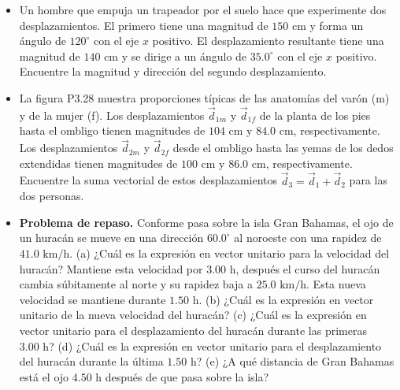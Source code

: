 \documentclass[11pt,a4paper]{article}
\begin{document}
\begin{itemize}
    \item[\textbf{27.}] Un hombre que empuja un trapeador por el suelo hace que experimente dos desplazamientos. El primero tiene una magnitud de $150 \text{ cm}$ y forma un ángulo de $120^\circ$ con el eje $x$ positivo. El desplazamiento resultante tiene una magnitud de $140 \text{ cm}$ y se dirige a un ángulo de $35.0^\circ$ con el eje $x$ positivo. Encuentre la magnitud y dirección del segundo desplazamiento.
    \vspace*{6cm}

    \item[\textbf{28.}] La figura P3.28 muestra proporciones típicas de las anatomías del varón (m) y de la mujer (f). Los desplazamientos $\vec{d}_{1m}$ y $\vec{d}_{1f}$ de la planta de los pies hasta el ombligo tienen magnitudes de $104 \text{ cm}$ y $84.0 \text{ cm}$, respectivamente. Los desplazamientos $\vec{d}_{2m}$ y $\vec{d}_{2f}$ desde el ombligo hasta las yemas de los dedos extendidas tienen magnitudes de $100 \text{ cm}$ y $86.0 \text{ cm}$, respectivamente. Encuentre la suma vectorial de estos desplazamientos $\vec{d}_3 = \vec{d}_1 + \vec{d}_2$ para las dos personas.
    \vspace*{6cm}

    \item[\textbf{29.}] \textbf{Problema de repaso.} Conforme pasa sobre la isla Gran Bahamas, el ojo de un huracán se mueve en una dirección $60.0^\circ$ al noroeste con una rapidez de $41.0 \text{ km/h}$. (a) ¿Cuál es la expresión en vector unitario para la velocidad del huracán? Mantiene esta velocidad por $3.00 \text{ h}$, después el curso del huracán cambia súbitamente al norte y su rapidez baja a $25.0 \text{ km/h}$. Esta nueva velocidad se mantiene durante $1.50 \text{ h}$. (b) ¿Cuál es la expresión en vector unitario de la nueva velocidad del huracán? (c) ¿Cuál es la expresión en vector unitario para el desplazamiento del huracán durante las primeras $3.00 \text{ h}$? (d) ¿Cuál es la expresión en vector unitario para el desplazamiento del huracán durante la última $1.50 \text{ h}$? (e) ¿A qué distancia de Gran Bahamas está el ojo $4.50 \text{ h}$ después de que pasa sobre la isla?
    \vspace*{8cm}
\end{itemize}

\newpage
\end{document}
